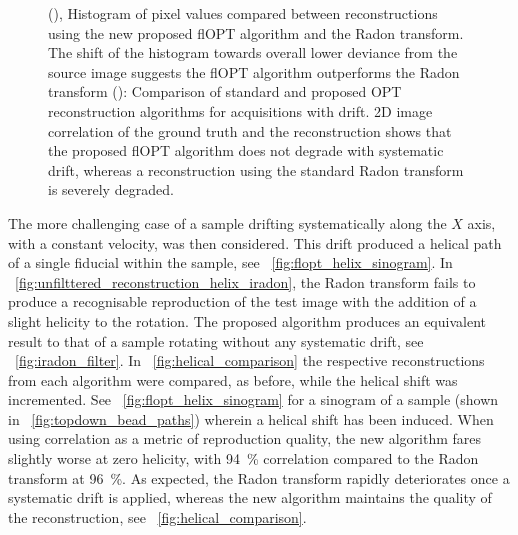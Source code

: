 \documentclass{osa-article}
\begin{document}
\begin{figure}
{    (), Histogram of pixel values compared between reconstructions using the new proposed flOPT algorithm and the Radon transform.
    The shift of the histogram towards overall lower deviance from the source image suggests the flOPT algorithm outperforms the Radon transform
    (): Comparison of standard and proposed OPT reconstruction algorithms for acquisitions with drift.
    2D image correlation of the ground truth and the reconstruction shows that the proposed flOPT algorithm does not degrade with systematic drift, whereas a reconstruction using the standard Radon transform is severely degraded.}
\end{figure}


The more challenging case of a sample drifting systematically along the \(X\) axis, with a constant velocity, was then considered. This drift produced a helical path of a single fiducial within the sample, see \figurename~\ref{fig:flopt_helix_sinogram}.
In \figurename~\ref{fig:unfilttered_reconstruction_helix_iradon}, the Radon transform fails to produce a recognisable reproduction of the test image with the addition of a slight helicity to the rotation.
The proposed algorithm produces an equivalent result to that of a sample rotating without any systematic drift, see \figurename~\ref{fig:iradon_filter}.
In \figurename~\ref{fig:helical_comparison} the respective reconstructions from each algorithm were compared, as before, while the helical shift was incremented.
See \figurename~\ref{fig:flopt_helix_sinogram} for a sinogram of a sample (shown in \figurename~\ref{fig:topdown_bead_paths}) wherein a helical shift has been induced.
When using correlation as a metric of reproduction quality, the new algorithm fares slightly worse at zero helicity, with \SI{94}{\percent} correlation compared to the Radon transform at \SI{96}{\percent}.
As expected, the Radon transform rapidly deteriorates once a systematic drift is applied, whereas the new algorithm maintains the quality of the reconstruction, see \figurename~\ref{fig:helical_comparison}.
\end{document}
